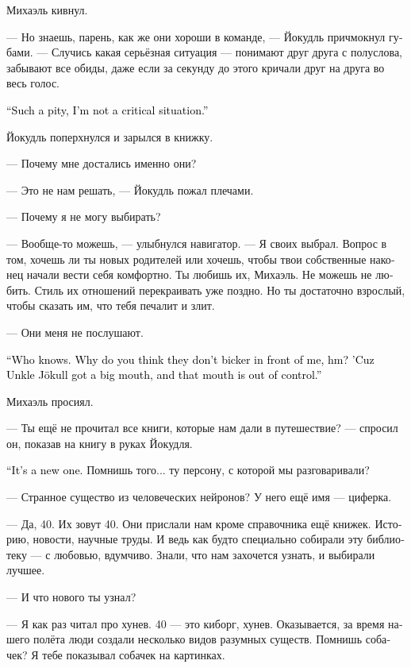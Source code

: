 \documentclass[a4paper,12pt,fleqn]{book}\usepackage{cooltooltips}\usepackage{polyglossia}\setdefaultlanguage[babelshorthands=true]{russian}\setotherlanguage{english}\defaultfontfeatures{Ligatures=TeX,Mapping=tex-text} \usepackage{xcolor}\definecolor{lightgray}{HTML}{bbbbbb}\color{lightgray}\newcommand{\ml}[3]{\textenglish{\textcolor{black}{#3}}}
\begin{document}
Михаэль кивнул.

--- Но знаешь, парень, как же они хороши в команде, --- Йокудль причмокнул губами.
--- Случись какая серьёзная ситуация --- понимают друг друга с полуслова, забывают все обиды, даже если за секунду до этого кричали друг на друга во весь голос.

\ml{$0$}
{--- Как жаль, что я не серьёзная ситуация.}
{``Such a pity, I'm not a critical situation.''}

Йокудль поперхнулся и зарылся в книжку.

--- Почему мне достались именно они?

--- Это не нам решать, --- Йокудль пожал плечами.

--- Почему я не могу выбирать?

--- Вообще-то можешь, --- улыбнулся навигатор.
--- Я своих выбрал.
Вопрос в том, хочешь ли ты новых родителей или хочешь, чтобы твои собственные наконец начали вести себя комфортно.
Ты любишь их, Михаэль.
Не можешь не любить.
Стиль их отношений перекраивать уже поздно.
Но ты достаточно взрослый, чтобы сказать им, что тебя печалит и злит.

--- Они меня не послушают.

\ml{$0$}
{--- Кто знает.}
{``Who knows.}
\ml{$0$}
{Как ты думаешь, почему они не цапаются при мне, м?}
{Why do you think they don't bicker in front of me, hm?}
\ml{$0$}
{Потому что у дяди Йокудля язык без костей и отсутствуют тормоза.}
{'Cuz Unkle Jökull got a big mouth, and that mouth is out of control.''}

Михаэль просиял.

--- Ты ещё не прочитал все книги, которые нам дали в путешествие? --- спросил он, показав на книгу в руках Йокудля.

\ml{$0$}
{--- Это новая.}
{``It's a new one.}
Помнишь того... ту персону, с которой мы разговаривали?

--- Странное существо из человеческих нейронов?
У него ещё имя --- циферка.

--- Да, 40.
Их зовут 40.
Они прислали нам кроме справочника ещё книжек.
Историю, новости, научные труды.
И ведь как будто специально собирали эту библиотеку --- с любовью, вдумчиво.
Знали, что нам захочется узнать, и выбирали лучшее.

--- И что нового ты узнал?

--- Я как раз читал про хунев.
40 --- это киборг, хунев.
Оказывается, за время нашего полёта люди создали несколько видов разумных существ.
Помнишь собачек?
Я тебе показывал собачек на картинках.
\end{document}
